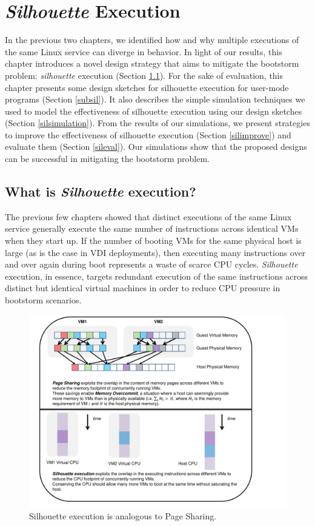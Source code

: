 \chapter{{\em Silhouette} Execution}
In the previous two chapters,
we identified how and why
multiple executions of the same
Linux service can diverge in behavior.
In light of our results, this chapter introduces a 
novel design strategy that aims to mitigate the bootstorm problem:
{\em silhouette} execution (Section \ref{def:sil}).
For the sake of evaluation, this chapter
presents some design sketches for silhouette
execution for user-mode programs (Section \ref{subsil}).
It also describes the simple simulation techniques we used 
to model the effectiveness of silhouette
execution using our design sketches
(Section \ref{silsimulation}).
From the results of our simulations, we present strategies
to improve the effectiveness of
silhouette execution (Section \ref{silimprove})
and evaluate them (Section \ref{sileval}).
Our simulations show that the proposed designs can be successful
in mitigating the bootstorm problem. 

\section{What is {\em Silhouette} execution?} \label{def:sil}
The previous few chapters showed that
distinct executions of the same Linux service
generally execute the same number of instructions
across identical VMs when they start up. If the number of booting VMs for
the same physical host is large (as is 
the case in VDI deployments),
then executing many instructions over
and over again during boot represents a waste of scarce CPU cycles.
{\em Silhouette} execution, in essence, targets
redundant execution of the same instructions across distinct but
identical virtual machines in order to reduce CPU pressure in bootstorm
scenarios. 

\newpage
\begin{figure} []
  \centering
  \includegraphics[scale=0.8, trim=2cm 0cm -5cm 0cm]{overcommit.pdf}
  \caption[Silhouette execution is analogous to Page Sharing.]%
          {Silhouette execution is analogous to Page Sharing.}

  \label{silconcept}
\end{figure}

